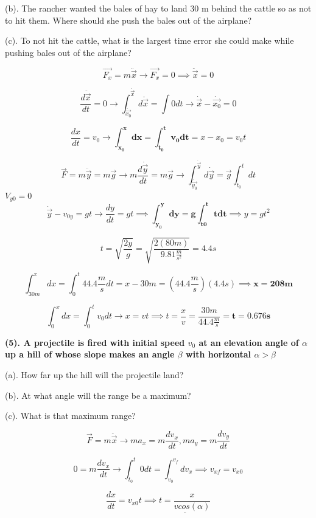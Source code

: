 \documentclass[12pt]{article}
\begin{document}
(b). The rancher wanted the bales of hay to land 30 m behind the cattle so as not to
hit them. Where should she push the bales out of the airplane?

(c). To not hit the cattle, what is the largest time error she could make while pushing
bales out of the airplane?

$$
\vec{F_x} = m \ddot{\vec{x}} \rightarrow \vec{F_x} = 0 \implies \ddot{\vec{x}} = 0
$$

$$
\frac{d\ddot{\vec{x}}}{dt} = 0  \rightarrow \int^{\ddot{\vec{x}}}_{\ddot{\vec{x_0}}}d\ddot{\vec{x}} = \int 0 dt \rightarrow \dot{\vec{x}} - \dot{\vec{x_0}} = 0
$$

$$
\frac{dx}{dt} = v_{0} \rightarrow \boldsymbol{\int^x_{x_0} dx = \int^{t}_{t_0} v_0 dt} = x - x_0 = v_0 t
$$

$$
\vec{F} = m \ddot{\vec{y}} = m \vec{g} \rightarrow m\frac{d\dot{\vec{y}}}{dt} = m\vec{g} \rightarrow \int^{\dot{\vec{y}}}_{\dot{\vec{y_0}}}d\dot{\vec{y}} = \vec{g}\int^{t}_{t_0}dt
$$
$V_{y0} = 0$
$$
\dot{\vec{y}} - v_{0y} = gt \rightarrow \frac{dy}{dt} = gt \implies \boldsymbol{\int^y_{y_0} dy = g \int^t_{t0} t dt} \implies y = gt^2
$$

$$
t = \sqrt{\frac{2y}{g}} = \sqrt{\frac{2(80m)}{9.81 \frac{m}{s^2}}} = 4.4 s 
$$

$$
\int^x_{30m} dx = \int^{t}_{0} 44.4 \frac{m}{s} dt = x - 30m = (44.4 \frac{m}{s})(4.4s) \implies \boldsymbol{x = 208m}
$$

$$
\int^x_{0} dx = \int^{t}_{0} v_0 dt \rightarrow x = vt \implies t = \frac{x}{v} = \frac{30m}{44.4\frac{m}{s}} = \boldsymbol{t = 0.676s} 
$$

\newpage
\textbf{
(5). A projectile is fired with initial speed $v_0$ at an elevation angle of $\alpha$
up a hill of whose slope makes an angle $\beta$ with horizontal $\alpha > \beta$
}

\hfill \break

(a). How far up the hill will the projectile land?

(b). At what angle will the range be a maximum?

(c). What is that maximum range?

$$
\vec{F} = m \ddot{\vec{x}} \rightarrow ma_x = m \frac{d v_x}{dt}, ma_y = m \frac{d v_y}{dt}
$$

$$
0 = m \frac{d v_x}{dt} \rightarrow \int^{t}_{t_0} 0 dt = \int^{v_f}_{v_0} dv_x \implies v_{xf} = v_{x0}
$$

$$
\frac{dx}{dt} = v_{x0} t \implies \underline{t = \frac{x}{vcos(\alpha)}}
$$
\end{document}
